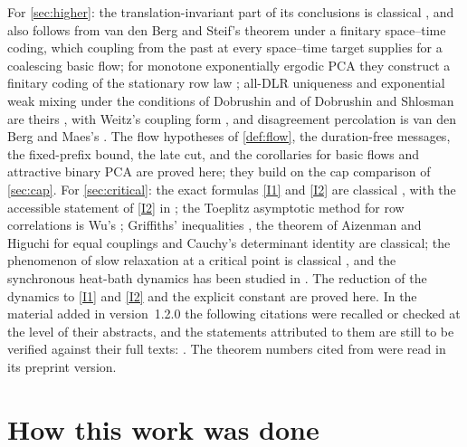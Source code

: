 \documentclass[11pt]{article}
\theoremstyle{plain}
\theoremstyle{definition}
\theoremstyle{remark}
\begin{document}
For \cref{sec:higher}: the translation-invariant part of its conclusions is classical \cite{GKLM89,LMS90}, and also follows from van den Berg and Steif's theorem \cite[Theorem~2.1]{vdBS99} under a finitary space--time coding, which coupling from the past \cite{PW96} at every space--time target supplies for a coalescing basic flow; for monotone exponentially ergodic PCA they construct a finitary coding of the stationary row law \cite[Theorem~3.4]{vdBS99}; all-DLR uniqueness and exponential weak mixing under the conditions of Dobrushin and of Dobrushin and Shlosman are theirs \cite{Dob68,DS85}, with Weitz's coupling form \cite{Weitz05}, and disagreement percolation is van den Berg and Maes's \cite{vdBM94}. The flow hypotheses of \cref{def:flow}, the duration-free messages, the fixed-prefix bound, the late cut, and the corollaries for basic flows and attractive binary PCA are proved here; they build on the cap comparison of \cref{sec:cap}. For \cref{sec:critical}: the exact formulas \ref{I1} and \ref{I2} are classical \cite{Yang52,Chang52,BGJS73,AML73,Baxter11,MPW63,MW73}, with the accessible statement of \ref{I2} in \cite{LyM07}; the Toeplitz asymptotic method for row correlations is Wu's \cite{Wu66}; Griffiths' inequalities \cite{Gri67,KS68}, the theorem of Aizenman and Higuchi for equal couplings \cite{Aiz80,Hig81} and Cauchy's determinant identity are classical; the phenomenon of slow relaxation at a critical point is classical \cite{Holley85,MS93,LS12}, and the synchronous heat-bath dynamics has been studied in \cite{KV80,DLR02,CNP01}. The reduction of the dynamics to \ref{I1} and \ref{I2} and the explicit constant are proved here. In the material added in version~1.2.0 the following citations were recalled or checked at the level of their abstracts, and the statements attributed to them are still to be verified against their full texts: \cite{GKLM89,DS85,Weitz05,Dob68,vdBM94,PW96,BMM13,HS00,Spinka20,Holley85,LS12,KV80,DLR02,CNP01,Yang52,Chang52,BGJS73,AML73,Baxter11,MPW63,MW73,Wu66,Gri67,KS68,Aiz80,Hig81}. The theorem numbers cited from \cite{vdBS99} were read in its preprint version.

\section*{How this work was done}
\end{document}
